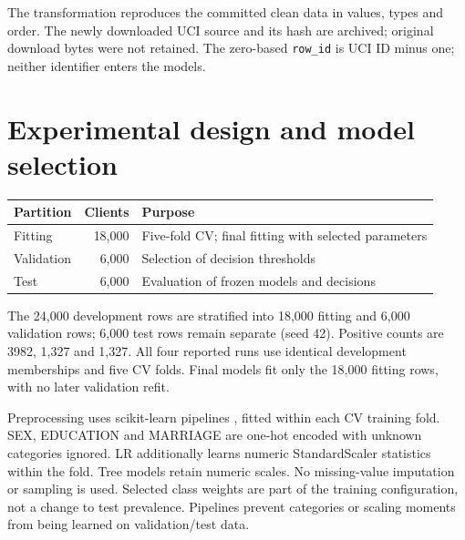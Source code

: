 \documentclass{article}
\begin{document}
The transformation reproduces the committed clean data in values, types and order. The newly downloaded UCI source and its hash are archived; original download bytes were not retained. The zero-based \texttt{row\_id} is UCI ID minus one; neither identifier enters the models.
\newpage
\section{Experimental design and model selection}
\begin{center}
\begin{minipage}{\linewidth}
\label{tab:split}\centering
\begin{tabularx}{\linewidth}{@{}lrX@{}}\toprule
Partition & Clients & Purpose\\\midrule
Fitting & 18,000 & Five-fold CV; final fitting with selected parameters\\
Validation & 6,000 & Selection of decision thresholds\\
Test & 6,000 & Evaluation of frozen models and decisions\\\bottomrule
\end{tabularx}
\end{minipage}
\end{center}
The 24,000 development rows are stratified into 18,000 fitting and 6,000 validation rows; 6,000 test rows remain separate (seed 42). Positive counts are 3982, 1,327 and 1,327. All four reported runs use identical development memberships and five CV folds. Final models fit only the 18,000 fitting rows, with no later validation refit.

Preprocessing uses scikit-learn pipelines \citep{sklearn}, fitted within each CV training fold. SEX, EDUCATION and MARRIAGE are one-hot encoded with unknown categories ignored. LR additionally learns numeric StandardScaler statistics within the fold. Tree models retain numeric scales. No missing-value imputation or sampling is used. Selected class weights are part of the training configuration, not a change to test prevalence. Pipelines prevent categories or scaling moments from being learned on validation/test data.
\end{document}
